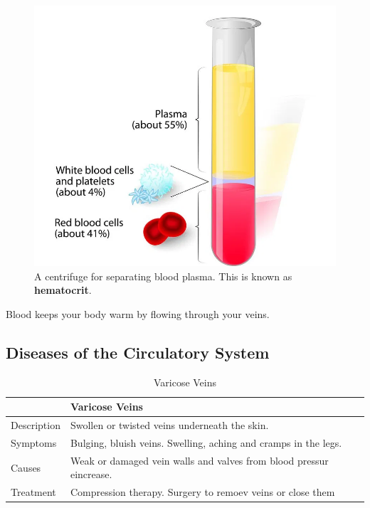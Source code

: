 \documentclass[12pt]{report}
\begin{document}
\begin{figure}[H]
\centering
    \includegraphics[width=0.5 \textwidth ]{../figures/hematocrit.png}
    \caption{A centrifuge for separating blood plasma. This is known as \textbf{hematocrit}.}
    \label{fig:hematocrit}
\end{figure}

\begin{note}{ }
    Blood keeps your body warm by flowing through your veins.
\end{note}

\subsection{Diseases of the Circulatory System}
\begin{table}
    \renewcommand{\arraystretch}{1.5}
    \setlength{\tabcolsep}{10pt}
    \setlength{\arrayrulewidth}{0.25mm}

    \begin{center}
        \vspace{0.5em}
        \begin{tabular}{|l|l|}
        \hline
         & Varicose Veins \\ 
        \hline
        Description & Swollen or twisted veins underneath the skin. \\
        \hline
        Symptoms & Bulging, bluish veins. Swelling, aching and cramps in the legs.\\ 
        \hline 
        Causes & Weak or damaged vein walls and valves from blood pressur eincrease. \\ 
        \hline 
        Treatment & Compression therapy. Surgery to remoev veins or close them\\ 
        \hline
        \end{tabular}
        \caption{Varicose Veins}
    \end{center}
\end{table}
\end{document}
